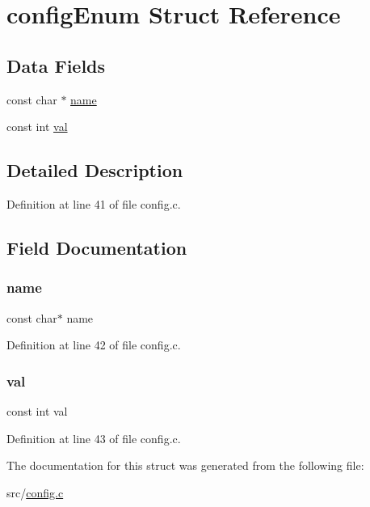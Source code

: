 \hypertarget{structconfig_enum}{}\section{config\+Enum Struct Reference}
\label{structconfig_enum}
\subsection*{Data Fields}
\begin{DoxyCompactItemize}
\item 
const char $\ast$ \hyperlink{structconfig_enum_a8f8f80d37794cde9472343e4487ba3eb}{name}
\item 
const int \hyperlink{structconfig_enum_a068078ac04671ae24b4f86f1b3b461ab}{val}
\end{DoxyCompactItemize}


\subsection{Detailed Description}


Definition at line 41 of file config.\+c.



\subsection{Field Documentation}
\mbox{\label{structconfig_enum_a8f8f80d37794cde9472343e4487ba3eb}} 
\subsubsection{\texorpdfstring{name}{name}}
{\footnotesize\ttfamily const char$\ast$ name}



Definition at line 42 of file config.\+c.

\mbox{\label{structconfig_enum_a068078ac04671ae24b4f86f1b3b461ab}} 
\subsubsection{\texorpdfstring{val}{val}}
{\footnotesize\ttfamily const int val}



Definition at line 43 of file config.\+c.



The documentation for this struct was generated from the following file\+:\begin{DoxyCompactItemize}
\item 
src/\hyperlink{config_8c}{config.\+c}\end{DoxyCompactItemize}
